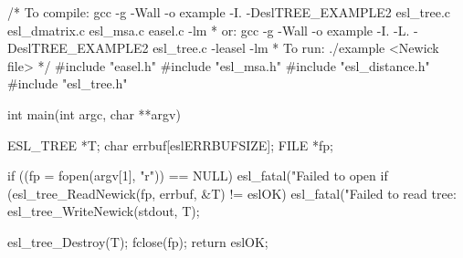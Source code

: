 \begin{cchunk}
/* To compile: gcc -g -Wall -o example -I. -DeslTREE_EXAMPLE2 esl_tree.c esl_dmatrix.c esl_msa.c easel.c -lm
 *         or: gcc -g -Wall -o example -I. -L. -DeslTREE_EXAMPLE2 esl_tree.c -leasel -lm
 *     To run: ./example <Newick file>
 */
#include "easel.h"
#include "esl_msa.h"
#include "esl_distance.h"
#include "esl_tree.h"

int main(int argc, char **argv)
{
  ESL_TREE    *T;
  char         errbuf[eslERRBUFSIZE];
  FILE        *fp;

  if ((fp = fopen(argv[1], "r"))           == NULL) esl_fatal("Failed to open %
  if (esl_tree_ReadNewick(fp, errbuf, &T) != eslOK) esl_fatal("Failed to read tree: %
  esl_tree_WriteNewick(stdout, T);

  esl_tree_Destroy(T);
  fclose(fp);
  return eslOK;
}
\end{cchunk}
